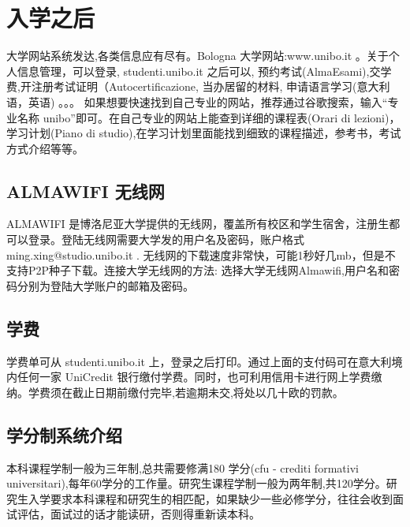 \documentclass[3pt,a5paper,openright,twoside]{book}
\begin{document}
\section{入学之后}
大学网站系统发达,各类信息应有尽有。Bologna 大学网站:www.unibo.it 。关于个人信息管理，可以登录, studenti.unibo.it 之后可以, 预约考试(AlmaEsami),交学费,开注册考试证明（Autocertificazione, 当办居留的材料, 申请语言学习(意大利语，英语) 。。。
如果想要快速找到自己专业的网站，推荐通过谷歌搜索，输入“专业名称 unibo”即可。在自己专业的网站上能查到详细的课程表(Orari di lezioni)，学习计划(Piano di studio),在学习计划里面能找到细致的课程描述，参考书，考试方式介绍等等。

\subsection{ALMAWIFI 无线网}
ALMAWIFI 是博洛尼亚大学提供的无线网，覆盖所有校区和学生宿舍，注册生都可以登录。登陆无线网需要大学发的用户名及密码，账户格式 ming.xing@studio.unibo.it . 无线网的下载速度非常快，可能1秒好几mb，但是不支持P2P种子下载。连接大学无线网的方法: 选择大学无线网Almawifi,用户名和密码分别为登陆大学账户的邮箱及密码。

\subsection{学费}
学费单可从 studenti.unibo.it 上，登录之后打印。通过上面的支付码可在意大利境内任何一家 UniCredit 银行缴付学费。同时，也可利用信用卡进行网上学费缴纳。学费须在截止日期前缴付完毕,若逾期未交,将处以几十欧的罚款。 

\subsection{学分制系统介绍}
本科课程学制一般为三年制,总共需要修满180 学分(cfu - crediti formativi universitari),每年60学分的工作量。研究生课程学制一般为两年制,共120学分。研究生入学要求本科课程和研究生的相匹配，如果缺少一些必修学分，往往会收到面试评估，面试过的话才能读研，否则得重新读本科。 
\end{document}
